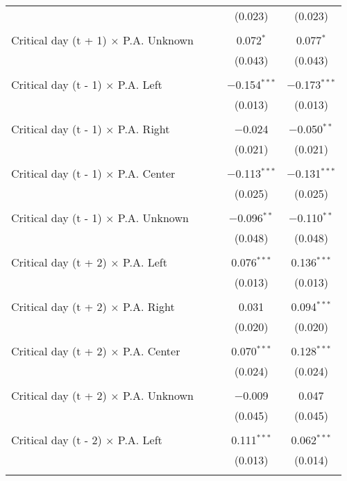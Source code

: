 \documentclass[
]{article}
\begin{document}
\begin{table}[!htbp]
{\begin{tabular}{@{\extracolsep{5pt}}lcccc}
  &  &  & (0.023) & (0.023) \\ 
  & & & & \\ 
 Critical day (t + 1) $\times$ P.A. Unknown &  &  & 0.072$^{*}$ & 0.077$^{*}$ \\ 
  &  &  & (0.043) & (0.043) \\ 
  & & & & \\ 
 Critical day (t - 1) $\times$ P.A. Left &  &  & $-$0.154$^{***}$ & $-$0.173$^{***}$ \\ 
  &  &  & (0.013) & (0.013) \\ 
  & & & & \\ 
 Critical day (t - 1) $\times$ P.A. Right &  &  & $-$0.024 & $-$0.050$^{**}$ \\ 
  &  &  & (0.021) & (0.021) \\ 
  & & & & \\ 
 Critical day (t - 1) $\times$ P.A. Center &  &  & $-$0.113$^{***}$ & $-$0.131$^{***}$ \\ 
  &  &  & (0.025) & (0.025) \\ 
  & & & & \\ 
 Critical day (t - 1) $\times$ P.A. Unknown &  &  & $-$0.096$^{**}$ & $-$0.110$^{**}$ \\ 
  &  &  & (0.048) & (0.048) \\ 
  & & & & \\ 
 Critical day (t + 2) $\times$ P.A. Left &  &  & 0.076$^{***}$ & 0.136$^{***}$ \\ 
  &  &  & (0.013) & (0.013) \\ 
  & & & & \\ 
 Critical day (t + 2) $\times$ P.A. Right &  &  & 0.031 & 0.094$^{***}$ \\ 
  &  &  & (0.020) & (0.020) \\ 
  & & & & \\ 
 Critical day (t + 2) $\times$ P.A. Center &  &  & 0.070$^{***}$ & 0.128$^{***}$ \\ 
  &  &  & (0.024) & (0.024) \\ 
  & & & & \\ 
 Critical day (t + 2) $\times$ P.A. Unknown &  &  & $-$0.009 & 0.047 \\ 
  &  &  & (0.045) & (0.045) \\ 
  & & & & \\ 
 Critical day (t - 2) $\times$ P.A. Left &  &  & 0.111$^{***}$ & 0.062$^{***}$ \\ 
  &  &  & (0.013) & (0.014) \\ 
  & & & & \\ 

\end{tabular}}
\end{table}
\end{document}
